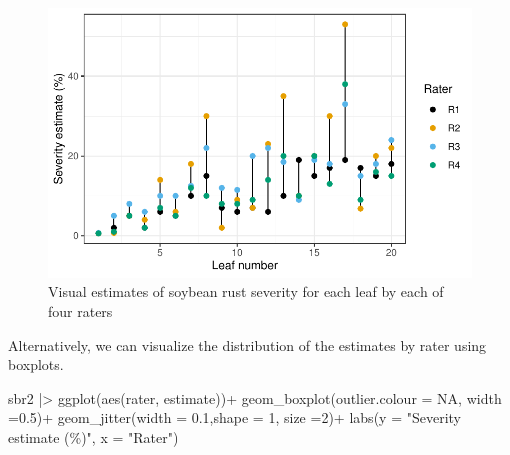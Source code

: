 \documentclass[
  letterpaper,
  DIV=11,
  numbers=noendperiod]{scrreprt}
\newenvironment{Shaded}{\begin{snugshade}}{\end{snugshade}}
\newcommand{\AttributeTok}[1]{\textcolor[rgb]{0.40,0.45,0.13}{#1}}
\newcommand{\ConstantTok}[1]{\textcolor[rgb]{0.56,0.35,0.01}{#1}}
\newcommand{\DecValTok}[1]{\textcolor[rgb]{0.68,0.00,0.00}{#1}}
\newcommand{\FloatTok}[1]{\textcolor[rgb]{0.68,0.00,0.00}{#1}}
\newcommand{\FunctionTok}[1]{\textcolor[rgb]{0.28,0.35,0.67}{#1}}
\newcommand{\NormalTok}[1]{\textcolor[rgb]{0.00,0.23,0.31}{#1}}
\newcommand{\SpecialCharTok}[1]{\textcolor[rgb]{0.37,0.37,0.37}{#1}}
\newcommand{\StringTok}[1]{\textcolor[rgb]{0.13,0.47,0.30}{#1}}
\begin{document}
\begin{figure}[H]

{\centering \includegraphics{./data-accuracy_files/figure-pdf/fig-raters1-1.pdf}

}

\caption{\label{fig-raters1}Visual estimates of soybean rust severity
for each leaf by each of four raters}

\end{figure}

Alternatively, we can visualize the distribution of the estimates by
rater using boxplots.

\begin{Shaded}
\begin{Highlighting}[]
\NormalTok{sbr2 }\SpecialCharTok{|\textgreater{}} 
  \FunctionTok{ggplot}\NormalTok{(}\FunctionTok{aes}\NormalTok{(rater, estimate))}\SpecialCharTok{+}
  \FunctionTok{geom\_boxplot}\NormalTok{(}\AttributeTok{outlier.colour =} \ConstantTok{NA}\NormalTok{, }\AttributeTok{width =}\FloatTok{0.5}\NormalTok{)}\SpecialCharTok{+}
  \FunctionTok{geom\_jitter}\NormalTok{(}\AttributeTok{width =} \FloatTok{0.1}\NormalTok{,}\AttributeTok{shape =} \DecValTok{1}\NormalTok{, }\AttributeTok{size =}\DecValTok{2}\NormalTok{)}\SpecialCharTok{+}
  \FunctionTok{labs}\NormalTok{(}\AttributeTok{y =} \StringTok{"Severity estimate (\%)"}\NormalTok{,}
       \AttributeTok{x =} \StringTok{"Rater"}\NormalTok{)}
\end{Highlighting}
\end{Shaded}
\end{document}
